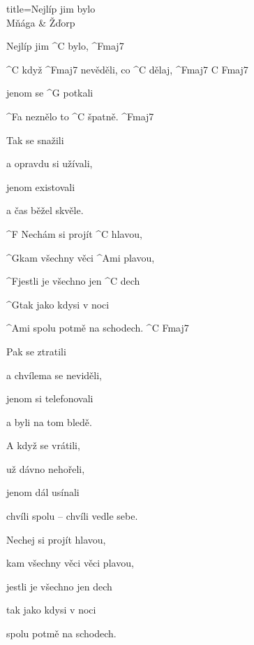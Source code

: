 \begin{song}{title=\predtitle\centering Nejlíp jim bylo \\\large Mňága \& Žďorp  \vspace*{-0.3cm}}  %
\begin{centerjustified}


\sloka
	Nejlíp jim ^{C \z}bylo, ^{Fmaj7}

	^{C \z}když ^{Fmaj7 \z}nevěděli, co ^{C \z}dělaj, ^{Fmaj7\,\,C\,\,Fmaj7}

	jenom se ^{G \z}potkali

	^{F}a neznělo to ^{C \z}špatně. ^{Fmaj7}

\sloka
	Tak se snažili

	a opravdu si užívali,

	jenom existovali

	a čas běžel skvěle.

	^{F \z}Nechám si projít ^{C \z}hlavou,

	^{G}kam všechny věci ^{Ami \z}plavou,

	^{F\z}jestli je všechno jen ^{C \z}dech

	^{G}tak jako kdysi v noci

	^{Ami\,\,}spolu potmě na schodech. ^{C\,\,Fmaj7}

\sloka
	Pak se ztratili

	a chvílema se neviděli,

	jenom si telefonovali

	a byli na tom bledě.

\sloka
	A když se vrátili,

	už dávno nehořeli,

	jenom dál usínali

	chvíli spolu -- chvíli vedle sebe.


	Nechej si projít hlavou,

	kam všechny věci věci plavou,

	jestli je všechno jen dech

	tak jako kdysi v noci

	spolu potmě na schodech.


\end{centerjustified}
\setcounter{Slokočet}{0}
\end{song}
